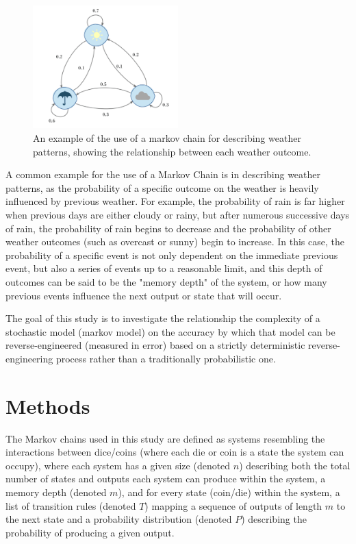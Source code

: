\documentclass[12pt]{article}
\begin{document}
\begin{figure}[H]
\centering
\includegraphics[width=0.5\textwidth]{images/weathermarkov.png}
\caption{An example of the use of a markov chain for describing weather patterns, showing the relationship between each weather outcome\cite{weather-markov-source}.}
\label{fig:weather-markov}
\end{figure}

A common example for the use of a Markov Chain is in describing weather patterns, as the probability of a specific outcome on the weather is heavily influenced by previous weather. For example, the probability of rain is far higher when previous days are either cloudy or rainy, but after numerous successive days of rain, the probability of rain begins to decrease and the probability of other weather outcomes (such as overcast or sunny) begin to increase. In this case, the probability of a specific event is not only dependent on the immediate previous event, but also a series of events up to a reasonable limit, and this depth of outcomes can be said to be the "memory depth" of the system, or how many previous events influence the next output or state that will occur.

The goal of this study is to investigate the relationship the complexity of a stochastic model (markov model) on the accuracy by which that model can be reverse-engineered (measured in error) based on a strictly deterministic reverse-engineering process rather than a traditionally probabilistic one.

\section{Methods}

The Markov chains used in this study are defined as systems resembling the interactions between dice/coins (where each die or coin is a state the system can occupy), where each system has a given size (denoted $n$) describing both the total number of states and outputs each system can produce within the system, a memory depth (denoted $m$), and for every state (coin/die) within the system, a list of transition rules (denoted $T$) mapping a sequence of outputs of length $m$ to the next state and a probability distribution (denoted $P$) describing the probability of producing a given output.
\end{document}
